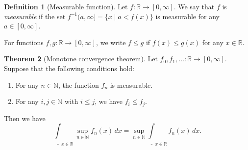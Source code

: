\documentclass{article}
\theoremstyle{definition}
\newtheorem{theorem}{Theorem}[section]
\newtheorem{definition}[theorem]{Definition}
\newtheorem{exercise}[theorem]{Exercise}
\begin{document}
\begin{definition}[Measurable function]
  Let $f : \mathbb{R} \to [0, \infty]$.
  We say that $f$ is \emph{measurable} if
  the set $f^{-1} (a, \infty] = \{ x \mid a < f(x) \}$ is measurable
  for any $a \in [0, \infty]$.
\end{definition}



For functions $f, g : \mathbb{R} \to [0, \infty]$,
we write $f \leq g$ if $f(x) \leq g(x)$ for any $x \in \mathbb{R}$.

\begin{theorem}[Monotone convergence theorem]
  \label{theorem:monotone convergence}
  Let $f_0, f_1, \dots : \mathbb{R} \to [0, \infty]$.
  Suppose that the following conditions hold:
  \begin{enumerate}
    \item For any $n \in \mathbb{N}$, the function $f_n$ is measurable.
    \item For any $i, j \in \mathbb{N}$ with $i \leq j$, we have $f_i \leq f_j$.
  \end{enumerate}
  Then we have
  \begin{equation*}
    \underline{\int}_{x \in \mathbb{R}} \sup_{n \in \mathbb{N}} f_n (x) \, dx
      = \sup_{n \in \mathbb{N}} \underline{\int}_{x \in \mathbb{R}} f_n (x) \, dx.
  \end{equation*}
\end{theorem}
\end{document}
